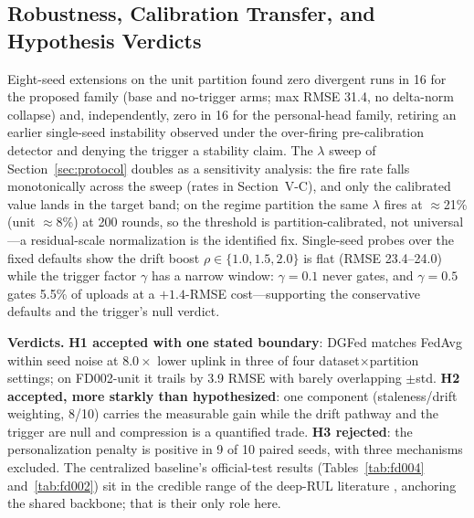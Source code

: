\documentclass[journal]{IEEEtran}
\newcommand{\dgfed}{DGFed}
\begin{document}
\subsection{Robustness, Calibration Transfer, and Hypothesis Verdicts}\label{sec:robust}
Eight-seed extensions on the unit partition found zero divergent runs in 16 for the proposed family (base and no-trigger arms; max RMSE 31.4, no delta-norm collapse) and, independently, zero in 16 for the personal-head family, retiring an earlier single-seed instability observed under the over-firing pre-calibration detector and denying the trigger a stability claim. The $\lambda$ sweep of Section~\ref{sec:protocol} doubles as a sensitivity analysis: the fire rate falls monotonically across the sweep (rates in Section~V-C), and only the calibrated value lands in the target band; on the regime partition the same $\lambda$ fires at $\approx$21\% (unit $\approx$8\%) at 200 rounds, so the threshold is partition-calibrated, not universal---a residual-scale normalization is the identified fix. Single-seed probes over the fixed defaults show the drift boost $\rho \in \{1.0, 1.5, 2.0\}$ is flat (RMSE 23.4--24.0) while the trigger factor $\gamma$ has a narrow window: $\gamma = 0.1$ never gates, and $\gamma = 0.5$ gates 5.5\% of uploads at a $+1.4$-RMSE cost---supporting the conservative defaults and the trigger's null verdict.

\textbf{Verdicts.} \textbf{H1 accepted with one stated boundary}: \dgfed{} matches FedAvg within seed noise at $8.0\times$ lower uplink in three of four dataset$\times$partition settings; on FD002-unit it trails by 3.9 RMSE with barely overlapping $\pm$std. \textbf{H2 accepted, more starkly than hypothesized}: one component (staleness/drift weighting, 8/10) carries the measurable gain while the drift pathway and the trigger are null and compression is a quantified trade. \textbf{H3 rejected}: the personalization penalty is positive in 9 of 10 paired seeds, with three mechanisms excluded.
The centralized baseline's official-test results (Tables~\ref{tab:fd004} and~\ref{tab:fd002}) sit in the credible range of the deep-RUL literature \cite{zheng2017,asif2022}, anchoring the shared backbone; that is their only role here.
\end{document}
